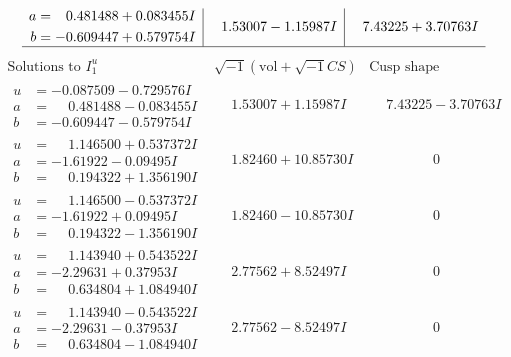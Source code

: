 \documentclass[1p]{elsarticle_modified}
\theoremstyle{definition}
\newcommand{\I}{\sqrt{-1}}
\begin{document}
$$\begin{array}{c|c|c}
\begin{aligned}
a &= \phantom{-}0.481488 + 0.083455 I \\
b &= -0.609447 + 0.579754 I\end{aligned}
 & \phantom{-}1.53007 - 1.15987 I & \phantom{-}7.43225 + 3.70763 I\\
 \hline 
 \end{array}$$\newpage$$\begin{array}{c|c|c}  
\text{Solutions to }I^u_{1}& \I (\text{vol} + \sqrt{-1}CS) & \text{Cusp shape}\\
 \hline 
\begin{aligned}
u &= -0.087509 - 0.729576 I \\
a &= \phantom{-}0.481488 - 0.083455 I \\
b &= -0.609447 - 0.579754 I\end{aligned}
 & \phantom{-}1.53007 + 1.15987 I & \phantom{-}7.43225 - 3.70763 I \\ \hline\begin{aligned}
u &= \phantom{-}1.146500 + 0.537372 I \\
a &= -1.61922 - 0.09495 I \\
b &= \phantom{-}0.194322 + 1.356190 I\end{aligned}
 & \phantom{-}1.82460 + 10.85730 I & \phantom{-0.000000 } 0 \\ \hline\begin{aligned}
u &= \phantom{-}1.146500 - 0.537372 I \\
a &= -1.61922 + 0.09495 I \\
b &= \phantom{-}0.194322 - 1.356190 I\end{aligned}
 & \phantom{-}1.82460 - 10.85730 I & \phantom{-0.000000 } 0 \\ \hline\begin{aligned}
u &= \phantom{-}1.143940 + 0.543522 I \\
a &= -2.29631 + 0.37953 I \\
b &= \phantom{-}0.634804 + 1.084940 I\end{aligned}
 & \phantom{-}2.77562 + 8.52497 I & \phantom{-0.000000 } 0 \\ \hline\begin{aligned}
u &= \phantom{-}1.143940 - 0.543522 I \\
a &= -2.29631 - 0.37953 I \\
b &= \phantom{-}0.634804 - 1.084940 I\end{aligned}
 & \phantom{-}2.77562 - 8.52497 I & \phantom{-0.000000 } 0 \\ \hline\begin{aligned}

\end{aligned}
\end{array}$$
\end{document}
